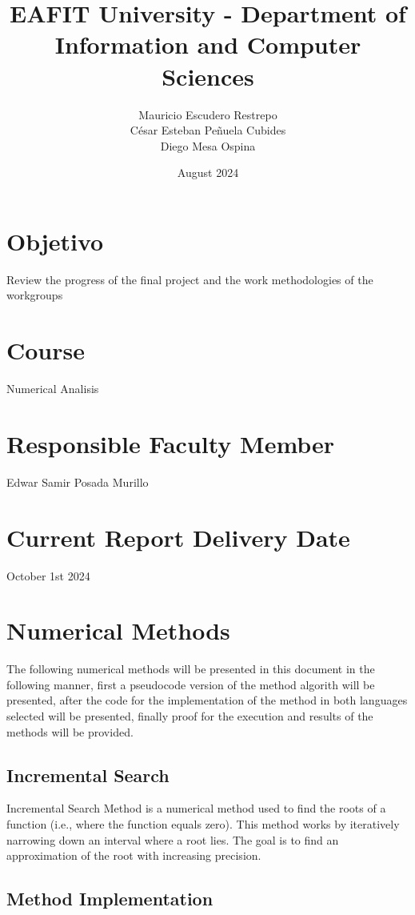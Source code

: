 \documentclass{article}
\title{EAFIT University - Department of Information and Computer Sciences}
\author{Mauricio Escudero Restrepo \\
        César Esteban Peñuela Cubides \\
        Diego Mesa Ospina}
\date{August 2024}
\begin{document}
\maketitle

\section{Objetivo}
Review the progress of the final project and the work methodologies of the workgroups

\section{Course}
Numerical Analisis

\section{Responsible Faculty Member}
Edwar Samir Posada Murillo

\section{Current Report Delivery Date}
October 1st 2024
    
\section[]{Numerical Methods}
    The following numerical methods will be presented in this document in the following manner, first a pseudocode 
    version of the method algorith will be presented, after the code for the implementation of the method in both 
    languages selected will be presented, finally proof for the execution and results of the methods will be provided.
    
    \subsection{Incremental Search}

    Incremental Search Method is a numerical method used to find the roots of a function
    (i.e., where the function equals zero).
    This method works by iteratively narrowing down an interval where a root
    lies.
    The goal is to find an approximation of the root with increasing precision.

    \subsection{Method Implementation}
\end{document}
